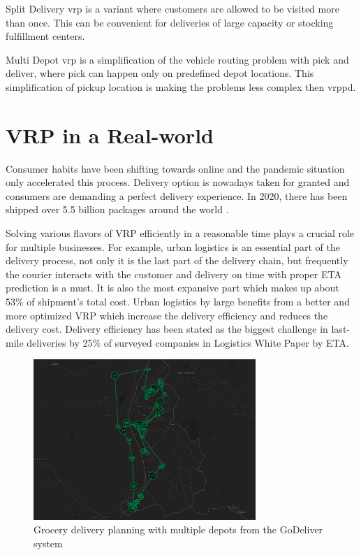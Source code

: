     Split Delivery \gls{vrp} \cite{split-deliver} is a variant where customers are allowed to be visited more than once. This can be convenient for deliveries of large capacity or stocking fulfillment centers.
    
    Multi Depot \gls{vrp} is a simplification of the vehicle routing problem with pick and deliver, where pick can happen only on predefined depot locations. This simplification of pickup location is making the problems less complex then \gls{vrppd}.
    
\section{VRP in a Real-world}
Consumer habits have been shifting towards online and the pandemic situation only accelerated this process. Delivery option is nowadays taken for granted and consumers are demanding a perfect delivery experience. In 2020, there has been shipped over 5.5 billion packages around the world \cite{num-shipped-packages}.

Solving various flavors of \gls{VRP} efficiently in a reasonable time plays a crucial role for multiple businesses. For example, urban logistics is an essential part of the delivery process, not only it is the last part of the delivery chain, but frequently the courier interacts with the customer and delivery on time with proper ETA prediction is a must. It is also the most expansive part which makes up about 53\% of shipment’s total cost\cite{last-mile-cost}. Urban logistics by large benefits from a better and more optimized \gls{VRP} which increase the delivery efficiency and reduces the delivery cost. Delivery efficiency has been stated as the biggest challenge in last-mile deliveries by 25\% of surveyed companies in Logistics White Paper by ETA\cite{logistics-whitepaper}.

\begin{figure}[ht]
    \centering
    \includegraphics[width=0.75\textwidth]{resources/intro/hofkorb.png}
    \caption{Grocery delivery planning with multiple depots from the GoDeliver system}
    \label{fig:hofkorb}
\end{figure}

